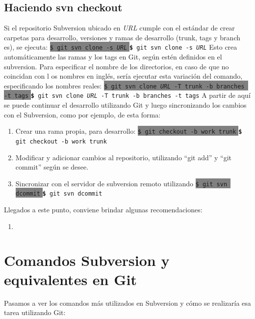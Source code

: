 \documentclass[12pt, spanish, oneside, onecolumn, a4paper]{report}
\newcommand{\shellcmd}[1]{ %
  \colorbox{Gray}{
    \indent\indent\texttt{\footnotesize\$ #1}
  }
  \colorbox{mygray}{
    \indent\indent\texttt{\textbf{\footnotesize\$} #1}
  }
}
\begin{document}
\subsection{Haciendo svn checkout} 
\label{sec:svncheckout} Si el repositorio Subversion ubicado en 
\emph{URL} cumple con el estándar de crear carpetas para desarrollo, versiones y ramas de desarrollo (trunk, tags y branch es), se ejecuta:
\shellcmd{git svn clone -s 
  \emph{URL}} Esto crea automáticamente las ramas y los tags en Git, según estén definidos en el subversion. Para especificar el nombre de los directorios, en caso de que no coincidan con l os nombres en inglés, sería ejecutar esta variación del comando, especificando los nombres reales: 
\shellcmd{git svn clone 
  \emph{URL} -T trunk -b branches -t tags} A partir de aquí se puede continuar el desarrollo utilizando Git y luego sincronizando los cambios con el Subversion, como por ejemplo, de esta forma: 
\begin{enumerate} 
\item Crear una rama propia, para desarrollo: 
  \shellcmd{git checkout -b work trunk} 
\item Modificar y adicionar cambios al repositorio, utilizando ``git add'' y ``git commit'' según se desee. 
\item Sincronizar con el servidor de subversion remoto utilizando 
  \shellcmd{git svn dcommit} 
\end{enumerate} Llegados a este punto, conviene brindar algunas recomendaciones: 
\begin{enumerate} 
\item 
\end{enumerate} 
\section{Comandos Subversion y equivalentes en Git} 
\label{sec:git2svn} Pasamos a ver los comandos más utilizados en Subversion y cómo se realizaría esa tarea utilizando Git:
\end{document}
